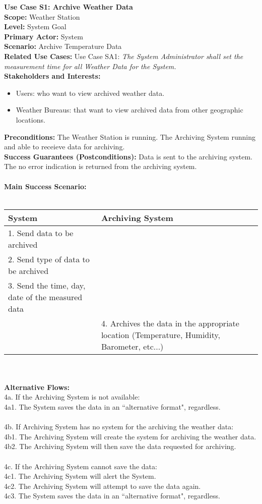 \documentclass[letterpaper]{article}
\begin{document}
\noindent
\textbf{Use Case S1:  Archive Weather Data}\\
\textbf{Scope: }Weather Station\\
\textbf{Level:  }System Goal\\
\textbf{Primary Actor:  }System\\
\textbf{Scenario:  }Archive Temperature Data\\
\textbf{Related Use Cases:  }Use Case SA1:  \emph{The System 
Administrator shall set the measurement time for all Weather Data
for the System.}\\
\textbf{Stakeholders and Interests:  }
\begin{itemize}
\item Users:  who want to view archived weather data.
\item Weather Bureaus:  that want to view archived data from other
geographic locations. 
\end{itemize}
\textbf{Preconditions:  }The Weather Station is running.  The
Archiving System running and able to receieve data for archiving.\\
\textbf{Success Guarantees (Postconditions):  }Data is sent to the
archiving system.  The no error indication is returned from the
archiving system.\\\\
\textbf{Main Success Scenario:  }\\\\
\begin{tabular}{|p{6cm}|p{6cm}|}\hline
\textbf{System} & \textbf{Archiving System}\\\hline
1. Send data to be archived & \\\hline
2. Send type of data to be archived & \\\hline
3. Send the time, day, date of the measured data & \\\hline
& 4.  Archives the data in the appropriate location (Temperature,
Humidity, Barometer, etc...)\\\hline
\end{tabular}\\\\
\textbf{Alternative Flows:  }\\
4a.  If the Archiving System is not available:\\
4a1.  The System saves the data in an ``alternative format",
regardless.\\\\
4b.  If Archiving System has no system for the archiving the weather
data:\\
4b1.  The Archiving System will create the system for archiving the
weather data.\\
4b2.  The Archiving System will then save the data requested for
archiving.\\\\
4c.  If the Archiving System cannot save the data:\\
4c1.  The Archiving System will alert the System.\\
4c2.  The Archiving System will attempt to save the data again.\\
4c3.  The System saves the data in an ``alternative format",
regardless.
\end{document}
